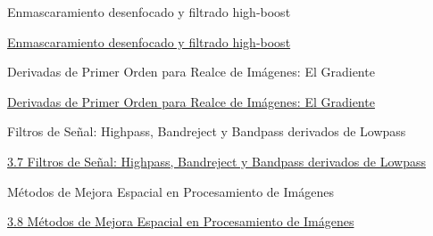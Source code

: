 \documentclass{beamer}
\begin{document}
\begin{frame}[fragile]{Enmascaramiento desenfocado y filtrado high-boost}

\href{run:Tema_3_6_pag_182.html}{Enmascaramiento desenfocado y filtrado high-boost}

\end{frame}

\begin{frame}[fragile]{Derivadas de Primer Orden para Realce de Imágenes: El Gradiente}

\href{run:Tema_3_6_pag_184.html}{Derivadas de Primer Orden para Realce de Imágenes: El Gradiente}

\end{frame}

\begin{frame}[fragile]{Filtros de Señal: Highpass, Bandreject y Bandpass derivados de Lowpass}

\href{run:Tema_3_7_pag_188.html}{3.7 Filtros de Señal: Highpass, Bandreject y Bandpass derivados de Lowpass}

\end{frame}

\begin{frame}[fragile]{Métodos de Mejora Espacial en Procesamiento de Imágenes}

\href{run:Tema_3_8_pag_191.html}{3.8 Métodos de Mejora Espacial en Procesamiento de Imágenes}

\end{frame}
\end{document}
